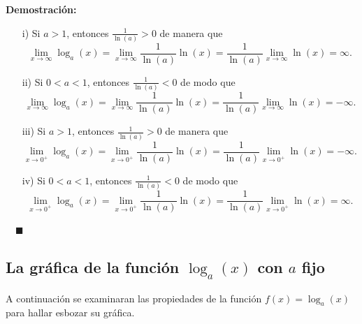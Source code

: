 \documentclass{article}
\numberwithin{equation}{section}
\newcommand{\Col}{\color{ProcessBlue}}
\newcommand{\col}[1]{\textcolor{ProcessBlue}{#1}}
\newcommand{\limit}[2]{\lim_{#1\to #2}}
\newenvironment
{proof}
{\par\medskip\noindent\textbf{Demostración:}\rmfamily}
{\Col\hfill$\quad \blacksquare$\vspace{0.5cm}}
\begin{document}
\begin{proof}
    \begin{enumerate}
        \item[i)] Si $a>1$, entonces $\frac{1}{\ln(a)}>0$ de manera que 
        $$ \limit{x}{\infty}\log_a(x)=\limit{x}{\infty}\frac{1}{\ln(a)}\ln(x)=\frac{1}{\ln(a)}\limit{x}{\infty}\ln(x)=\infty. $$
        \item[ii)] Si $0<a<1$, entonces $\frac{1}{\ln(a)}<0$ de modo que 
        $$ \limit{x}{\infty}\log_a(x)=\limit{x}{\infty}\frac{1}{\ln(a)}\ln(x)=\frac{1}{\ln(a)}\limit{x}{\infty}\ln(x)=-\infty. $$
        \item[iii)] Si $a>1$, entonces $\frac{1}{\ln(a)}>0$ de manera que 
        $$ \limit{x}{0^+}\log_a(x)=\limit{x}{0^+}\frac{1}{\ln(a)}\ln(x)=\frac{1}{\ln(a)}\limit{x}{0^+}\ln(x)=-\infty .$$
        \item[iv)] Si $0<a<1$, entonces $\frac{1}{\ln(a)}<0$ de modo que 
        $$ \limit{x}{0^+}\log_a(x)=\limit{x}{0^+}\frac{1}{\ln(a)}\ln(x)=\frac{1}{\ln(a)}\limit{x}{0^+}\ln(x)=\infty .$$
        \end{enumerate}
\end{proof}

\subsection{\col{La gráfica de la función \ensuremath{\log_a(x)} con \ensuremath{a} fijo}}

A continuación se examinaran las propiedades de la función $f(x)=\log_a(x)$ para hallar esbozar su gráfica.

\end{document}
